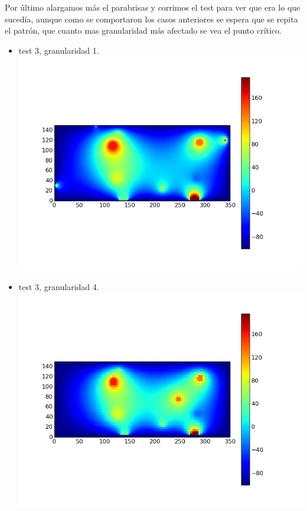 Por último alargamos más el parabrisas y corrimos el test para ver que era lo que sucedía, aunque como se comportaron los casos anteriores se espera que se repita el patrón, que cuanto mas granularidad más afectado se vea el punto crítico.
\begin{itemize}
 \item test 3, granularidad 1.\\
  \includegraphics[width=400pt]{imagenes/testpropios/test31.png}

 \item test 3, granularidad 4.\\
  \includegraphics[width=400pt]{imagenes/testpropios/test34.png}
\end{itemize}
